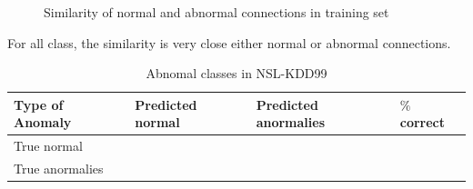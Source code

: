 \begin{figure}[htb2]
\begin{center}
\end{center}
\caption{Similarity of normal and abnormal connections in training set} %
\label{fig:refSingleRobot1}
\end{figure}
For all class, the similarity is very close either normal or abnormal connections. 
\begin{table}[h]
\begin{center}
\begin{tabular}{| l | l | l | p{5cm} |}
\hline
Type of Anomaly & Predicted normal & Predicted anormalies & $\%$ correct\\
\hline
True normal &  &  & \\
\hline
True anormalies &  &  & \\
\hline
\end{tabular}
\end{center}
\caption{Abnomal classes in NSL-KDD99}
\label{fig:refSingleRobot1}
\end{table}

